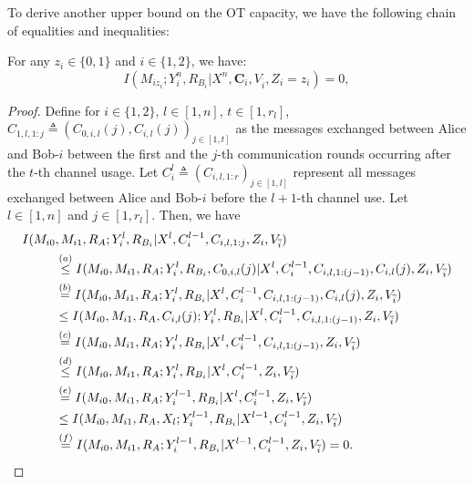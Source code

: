 \documentclass[runningheads]{llncs}
\newcommand{\parbreak}{ \vspace{0.3 em}}
\begin{document}
\parbreak To derive another upper bound on the OT capacity, we have the following chain of equalities and inequalities:
\begin{lemma}\label{lemma: Rudolf-app}
For any $z_i\in \{0, 1\}$ and $i\in\{1,2\}$, we have: 
\[
I(M_{iz_i}; Y_i^n, R_{B_i} | X^n, \mathbf{C}_i,V_{\overline{i}}, Z_i = z_i) = 0,
\]
\end{lemma}
\begin{proof}
    Define for $i \in \{1,2\}$, $l \in [1, n]$, $t \in [1, r_l]$, $C_{1, l, 1:j} \triangleq (C_{0, i,l}(j), C_{i, l}(j))_{j \in [1, t]}$ as the messages exchanged between Alice and Bob-$i$ between the first and the $j$-th communication rounds occurring after the $t$-th channel usage. Let $C_i^l \triangleq (C_{i, l, 1:r})_{j \in [1, l]}$ represent all messages exchanged between Alice and Bob-$i$ before the $l+1$-th channel use. Let $l \in [1, n]$ and $j \in [1, r_l]$. Then, we have
\begin{align}\label{eq 1}
    I(M_{i0}&, M_{i1},  R_A; Y_i^l, R_{B_i} | X^l, C_i^{l-1},C_{i,l,1:j}, Z_i, V_{\overline{i}})\notag\\
    & \overset{(a)}{\leq} I(M_{i0}, M_{i1}, R_A; Y_i^l, R_{B_i}, C_{0,i,l}(j) | X^l, C_i^{l-1},C_{i,l,1:(j-1)}, C_{i,l}(j), Z_i, V_{\overline{i}})\\ 
    & \overset{(b)}{=} I(M_{i0}, M_{i1}, R_A; Y_i^l, R_{B_i} | X^l, C_i^{l-1},C_{i,l,1:(j-1)}, C_{i,l}(j), Z_i, V_{\overline{i}})\notag\\
    & \leq I(M_{i0}, M_{i1}, R_A, C_{i,l}(j); Y_i^l, R_{B_i} | X^l, C_i^{l-1},C_{i,l,1:(j-1)},  Z_i ,V_{\overline{i}})\notag\\
    &\overset{(c)}{=} I(M_{i0}, M_{i1}, R_A; Y_i^l, R_{B_i} | X^l, C_i^{l-1},C_{i,l,1:(j-1)}, Z_i, V_{\overline{i}})\label{eq 2} \\
    &\overset{(d)}{\leq} I(M_{i0}, M_{i1}, R_A; Y_i^{l}, R_{B_i} | X^l, C_i^{l-1}, Z_i, V_{\overline{i}}) \notag\\
    &\overset{(e)}{=} I(M_{i0}, M_{i1}, R_A ; Y_i^{l-1}, R_{B_i} | X^l, C_i^{l-1}, Z_i, V_{\overline{i}}) \notag\\
    &\leq I(M_{i0}, M_{i1}, R_A, X_{l}; Y_i^{l-1}, R_{B_i} | X^{l-1}, C_i^{l-1}, Z_i, V_{\overline{i}}) \notag\\
    &\overset{(f)}{=} I(M_{i0}, M_{i1}, R_A; Y_i^{l-1}, R_{B_i} | X^{l-1}, C_i^{l-1}, Z_i, V_{\overline{i}})\label{eq 3} = 0.    
\end{align}


\end{proof}
\end{document}
